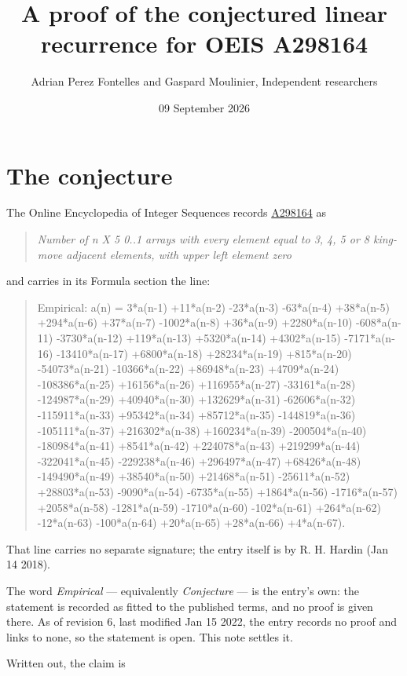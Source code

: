 \documentclass[11pt]{article}
\title{A proof of the conjectured linear recurrence for OEIS A298164}
\author{Adrian Perez Fontelles and Gaspard Moulinier, Independent researchers}
\date{09 September 2026}
\theoremstyle{definition}
\begin{document}
\maketitle
\section{The conjecture}

The Online Encyclopedia of Integer Sequences records \href{https://oeis.org/A298164}{A298164} as

\begin{quote}\itshape Number of n X 5 0..1 arrays with every element equal to 3, 4, 5 or 8 king-move adjacent elements, with upper left element zero\end{quote}

and carries in its Formula section the line:

\begin{quote}\ttfamily Empirical: a(n) = 3*a(n-1) +11*a(n-2) -23*a(n-3) -63*a(n-4) +38*a(n-5) +294*a(n-6) +37*a(n-7) -1002*a(n-8) +36*a(n-9) +2280*a(n-10) -608*a(n-11) -3730*a(n-12) +119*a(n-13) +5320*a(n-14) +4302*a(n-15) -7171*a(n-16) -13410*a(n-17) +6800*a(n-18) +28234*a(n-19) +815*a(n-20) -54073*a(n-21) -10366*a(n-22) +86948*a(n-23) +4709*a(n-24) -108386*a(n-25) +16156*a(n-26) +116955*a(n-27) -33161*a(n-28) -124987*a(n-29) +40940*a(n-30) +132629*a(n-31) -62606*a(n-32) -115911*a(n-33) +95342*a(n-34) +85712*a(n-35) -144819*a(n-36) -105111*a(n-37) +216302*a(n-38) +160234*a(n-39) -200504*a(n-40) -180984*a(n-41) +8541*a(n-42) +224078*a(n-43) +219299*a(n-44) -322041*a(n-45) -229238*a(n-46) +296497*a(n-47) +68426*a(n-48) -149490*a(n-49) +38540*a(n-50) +21468*a(n-51) -25611*a(n-52) +28803*a(n-53) -9090*a(n-54) -6735*a(n-55) +1864*a(n-56) -1716*a(n-57) +2058*a(n-58) -1281*a(n-59) -1710*a(n-60) -102*a(n-61) +264*a(n-62) -12*a(n-63) -100*a(n-64) +20*a(n-65) +28*a(n-66) +4*a(n-67).\end{quote}

That line carries no separate signature; the entry itself is by R. H. Hardin (Jan 14 2018).

The word {\itshape Empirical} --- equivalently {\itshape Conjecture} --- is the entry's own: the statement is recorded as fitted to the published terms, and no proof is given there. As of revision 6, last modified Jan 15 2022, the entry records no proof and links to none, so the statement is open. This note settles it.

Written out, the claim is
\end{document}
